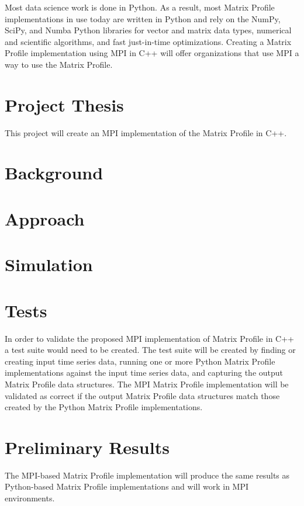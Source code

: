 \documentclass[conference]{IEEEtran}
\begin{document}
Most data science work is done in Python.  As a result, most Matrix Profile implementations in use today are written in Python \cite{Stumpy} and rely on the NumPy, SciPy, and Numba Python libraries for vector and matrix data types, numerical and scientific algorithms, and fast just-in-time optimizations.  Creating a Matrix Profile implementation using MPI in C++ will offer organizations that use MPI a way to use the Matrix Profile. 

\section{Project Thesis}
This project will create an MPI implementation of the Matrix Profile in C++.

\section{Background}

\section{Approach}

\section{Simulation}

\section{Tests}
In order to validate the proposed MPI implementation of Matrix Profile in C++ a test suite would need to be created.  The test suite will be created by finding or creating input time series data, running one or more Python Matrix Profile implementations against the input time series data, and capturing the output Matrix Profile data structures.  The MPI Matrix Profile implementation will be validated as correct if the output Matrix Profile data structures match those created by the Python Matrix Profile implementations. 

\section{Preliminary Results}
The MPI-based Matrix Profile implementation will produce the same results as Python-based Matrix Profile implementations and will work in MPI environments.


\end{document}
